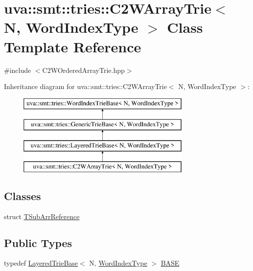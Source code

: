 \hypertarget{classuva_1_1smt_1_1tries_1_1_c2_w_array_trie}{}\section{uva\+:\+:smt\+:\+:tries\+:\+:C2\+W\+Array\+Trie$<$ N, Word\+Index\+Type $>$ Class Template Reference}
\label{classuva_1_1smt_1_1tries_1_1_c2_w_array_trie}


{\ttfamily \#include $<$C2\+W\+Ordered\+Array\+Trie.\+hpp$>$}

Inheritance diagram for uva\+:\+:smt\+:\+:tries\+:\+:C2\+W\+Array\+Trie$<$ N, Word\+Index\+Type $>$\+:\begin{figure}[H]
\begin{center}
\leavevmode
\includegraphics[height=4.000000cm]{classuva_1_1smt_1_1tries_1_1_c2_w_array_trie}
\end{center}
\end{figure}
\subsection*{Classes}
\begin{DoxyCompactItemize}
\item 
struct \hyperlink{structuva_1_1smt_1_1tries_1_1_c2_w_array_trie_1_1_t_sub_arr_reference}{T\+Sub\+Arr\+Reference}
\end{DoxyCompactItemize}
\subsection*{Public Types}
\begin{DoxyCompactItemize}
\item 
typedef \hyperlink{classuva_1_1smt_1_1tries_1_1_layered_trie_base}{Layered\+Trie\+Base}$<$ N, \hyperlink{classuva_1_1smt_1_1tries_1_1_word_index_trie_base_a30c4fffe3a3423c87b229b66340dd2f8}{Word\+Index\+Type} $>$ \hyperlink{classuva_1_1smt_1_1tries_1_1_c2_w_array_trie_a9891b271388cf50ce1344b05e70f6158}{B\+A\+S\+E}
\end{DoxyCompactItemize}
